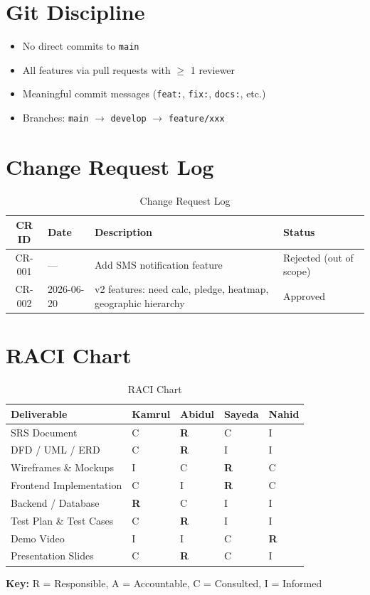 \section{Git Discipline}
\begin{itemize}[nosep]
    \item No direct commits to \texttt{main}
    \item All features via pull requests with $\ge$ 1 reviewer
    \item Meaningful commit messages (\texttt{feat:}, \texttt{fix:}, \texttt{docs:}, etc.)
    \item Branches: \texttt{main} $\rightarrow$ \texttt{develop} $\rightarrow$ \texttt{feature/xxx}
\end{itemize}

\section{Change Request Log}
\begin{table}[H]
\centering
\caption{Change Request Log}
\label{tab:cr}
\begin{tabularx}{\textwidth}{@{}cllX@{}}
\toprule
CR ID & Date & Description & Status \\
\midrule
CR-001 & --- & Add SMS notification feature & Rejected (out of scope) \\
CR-002 & 2026-06-20 & v2 features: need calc, pledge, heatmap, geographic hierarchy & Approved \\
\bottomrule
\end{tabularx}
\end{table}

\section{RACI Chart}
\begin{table}[H]
\centering
\caption{RACI Chart}
\label{tab:raci}
\begin{tabularx}{\textwidth}{@{}lXXXX@{}}
\toprule
Deliverable & Kamrul & Abidul & Sayeda & Nahid \\
\midrule
SRS Document & C & \textbf{R} & C & I \\
DFD / UML / ERD & C & \textbf{R} & I & I \\
Wireframes \& Mockups & I & C & \textbf{R} & C \\
Frontend Implementation & C & I & \textbf{R} & C \\
Backend / Database & \textbf{R} & C & I & I \\
Test Plan \& Test Cases & C & \textbf{R} & I & I \\
Demo Video & I & I & C & \textbf{R} \\
Presentation Slides & C & \textbf{R} & C & I \\
\bottomrule
\end{tabularx}
\end{table}

\vspace{0.3cm}
\noindent\textbf{Key:} R = Responsible, A = Accountable, C = Consulted, I = Informed
